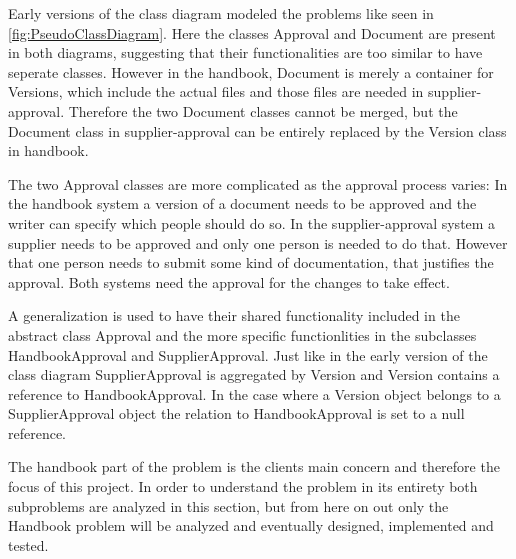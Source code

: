 Early versions of the class diagram modeled the problems like seen in \cref{fig:PseudoClassDiagram}.
Here the classes Approval and Document are present in both diagrams, suggesting that their functionalities are too similar to have seperate classes. However in the handbook, Document is merely a container for Versions, which include the actual files and those files are needed in supplier-approval. Therefore the two Document classes cannot be merged, but the Document class in supplier-approval can be entirely replaced by the Version class in handbook.

The two Approval classes are more complicated as the approval process varies:
In the handbook system a version of a document needs to be approved and the writer can specify which people should do so.
In the supplier-approval system a supplier needs to be approved and only one person is needed to do that.
However that one person needs to submit some kind of documentation, that justifies the approval.
Both systems need the approval for the changes to take effect.

A generalization is used to have their shared functionality included in the abstract class Approval and the more specific functionlities in the subclasses HandbookApproval and SupplierApproval. 
Just like in the early version of the class diagram SupplierApproval is aggregated by Version and Version contains a reference to HandbookApproval.
In the case where a Version object belongs to a SupplierApproval object the relation to HandbookApproval is set to a null reference.

The handbook part of the problem is the clients main concern and therefore the focus of this project.
In order to understand the problem in its entirety both subproblems are analyzed in this section, but from here on out only the Handbook problem will be analyzed and eventually designed, implemented and tested.